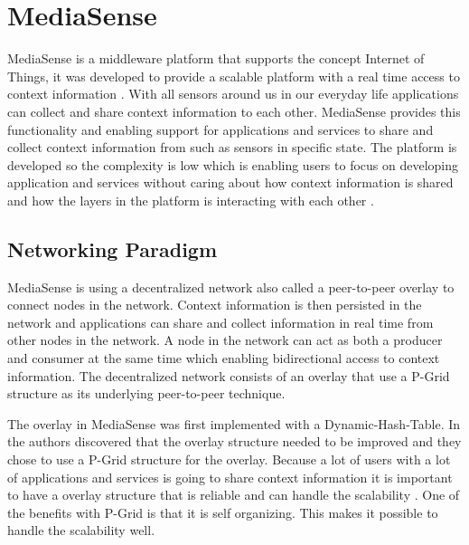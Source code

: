 \section{MediaSense}
MediaSense is a middleware platform that supports the concept Internet of Things, it was developed to provide a scalable platform with a real time access to context information \cite{Kanter539187}. With all sensors around us in our everyday life applications can collect and share context information to each other. MediaSense provides this functionality and enabling support for applications and services to share and collect context information from such as sensors in specific state. The platform is developed so the complexity is low which is enabling users to focus on developing application and services without caring about how context information is shared and how the layers in the platform is interacting with each other \cite{Walters413794}. 

\subsection{Networking Paradigm}
MediaSense is using a decentralized network also called a peer-to-peer overlay to connect nodes in the network. Context information is then persisted in the network and applications can share and collect information in real time from other nodes in the network. A node in the network can act as both a producer and consumer at the same time which enabling bidirectional access to context information. The decentralized network consists of an overlay that use a P-Grid \cite{aberer2003p} structure as its underlying peer-to-peer technique.

The overlay in MediaSense was first implemented with a Dynamic-Hash-Table. In \cite{Walters413794} the authors discovered that the overlay structure needed to be improved and they chose to use a P-Grid structure for the overlay. Because a lot of users with a lot of applications and services is going to share context information it is important to have a overlay structure that is reliable and can handle the scalability \cite{aberer2003p}. One of the benefits with P-Grid is that it is self organizing. This makes it possible to handle the scalability well.

